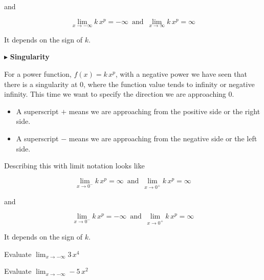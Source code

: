 \documentclass{ximera}
\begin{document}
and 

\[    \lim_{x \to -\infty} k \, x^p =  -\infty  \,   \text{ and }  \,     \lim_{x \to \infty} k \, x^p = \infty      \]


It depends on the sign of $k$.



$\blacktriangleright$  \textbf{Singularity}



For a power function, $f(x) = k \, x^p$, with a negative power we have seen that there is a singularity at $0$, where the function value tends to infinity or negative infinity.  This time we want to specify the direction we are approaching $0$.  

\begin{itemize}
\item A superscript $+$ means we are approaching from the positive side or the right side.
\item A superscript $-$ means we are approaching from the negative side or the left side.
\end{itemize}


Describing this with limit notation looks like




\[    \lim_{x \to 0^-} k \, x^p =  \infty  \,   \text{ and }  \,     \lim_{x \to 0^+} k \, x^p = \infty      \]


and 

\[    \lim_{x \to 0^-} k \, x^p =  -\infty  \,   \text{ and }  \,     \lim_{x \to 0^+} k \, x^p = \infty      \]



It depends on the sign of $k$.









\begin{question}

Evaluate $\lim_{x \to -\infty} 3 \, x^4$

\begin{multipleChoice}
\choice {$-\infty$}
\choice [correct]{$\infty$}
\end{multipleChoice}
\end{question}






\begin{question}

Evaluate $\lim_{x \to -\infty} -5 \, x^2$

\begin{multipleChoice}
\choice [correct]{$-\infty$}
\choice {$\infty$}
\end{multipleChoice}
\end{question}
\end{document}
